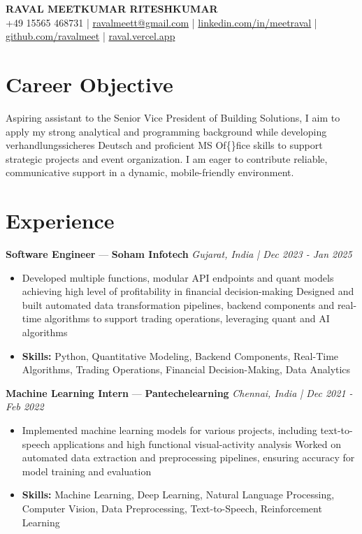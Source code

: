\documentclass[a4paper,10pt]{article}
\begin{document}
\begin{center}
  {\Large\bfseries RAVAL MEETKUMAR RITESHKUMAR}\\[2pt]
  {\small +49 15565 468731 \;|\; \href{mailto:ravalmeett@gmail.com}{ravalmeett@gmail.com} \;|\; \href{https://www.linkedin.com/in/meetraval/}{linkedin.com/in/meetraval} \;|\; \href{https://github.com/ravalmeet}{github.com/ravalmeet} \;|\; \href{https://raval.vercel.app/}{raval.vercel.app}}
\end{center}
\vspace{-3pt}

\section*{Career Objective}
Aspiring assistant to the Senior Vice President of Building Solutions, I aim to apply my strong analytical and programming background while developing verhandlungssicheres Deutsch and proficient MS Of\{\}fice skills to support strategic projects and event organization. I am eager to contribute reliable, communicative support in a dynamic, mobile-friendly environment.\par

\section*{Experience}
\textbf{Software Engineer} — \textbf{Soham Infotech} \hfill \textit{Gujarat, India \;|\; Dec 2023 - Jan 2025}\par
\vspace{1pt}
\begin{itemize}
  \item Developed multiple functions, modular API endpoints and quant models achieving high level of profitability in financial decision-making Designed and built automated data transformation pipelines, backend components and real-time algorithms to support trading operations, leveraging quant and AI algorithms
  \item \textbf{Skills:} Python, Quantitative Modeling, Backend Components, Real-Time Algorithms, Trading Operations, Financial Decision-Making, Data Analytics
\end{itemize}
\vspace{3pt}
\textbf{Machine Learning Intern} — \textbf{Pantechelearning} \hfill \textit{Chennai, India \;|\; Dec 2021 - Feb 2022}\par
\vspace{1pt}
\begin{itemize}
  \item Implemented machine learning models for various projects, including text-to-speech applications and high functional visual-activity analysis Worked on automated data extraction and preprocessing pipelines, ensuring accuracy for model training and evaluation
  \item \textbf{Skills:} Machine Learning, Deep Learning, Natural Language Processing, Computer Vision, Data Preprocessing, Text-to-Speech, Reinforcement Learning
\end{itemize}
\end{document}
